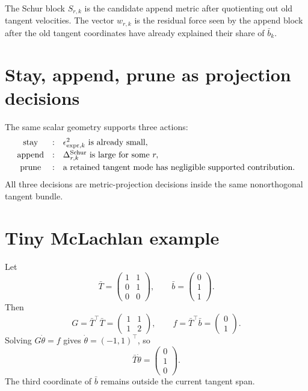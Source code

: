 \documentclass[10pt,twocolumn]{article}
\begin{document}
\begin{jargonbox}
The Schur block \(S_{r,k}\) is the candidate append metric after quotienting out old tangent velocities. The vector \(w_{r,k}\) is the residual force seen by the append block after the old tangent coordinates have already explained their share of \(\bar b_k\).
\end{jargonbox}

\section{Stay, append, prune as projection decisions}

The same scalar geometry supports three actions:
\begin{equation}
\begin{array}{ccl}
\text{stay}&:&\epsilon_{{\rm expr},k}^2\text{ is already small},\\[1mm]
\text{append}&:&\Delta_{r,k}^{\rm Schur}\text{ is large for some }r,\\[1mm]
\text{prune}&:&\text{a retained tangent mode has negligible supported contribution}.
\end{array}
\label{eq:p2_actions}
\end{equation}
All three decisions are metric-projection decisions inside the same nonorthogonal tangent bundle.

\appendix
\section{Tiny McLachlan example}

Let
\begin{equation}
\bar T=\begin{pmatrix}1&1\\0&1\\0&0\end{pmatrix},
\qquad
\bar b=\begin{pmatrix}0\\1\\1\end{pmatrix}.
\end{equation}
Then
\begin{equation}
G=\bar T^\top\bar T=\begin{pmatrix}1&1\\1&2\end{pmatrix},
\qquad
f=\bar T^\top\bar b=\begin{pmatrix}0\\1\end{pmatrix}.
\end{equation}
Solving \(G\dot\theta=f\) gives \(\dot\theta=(-1,1)^\top\), so
\begin{equation}
\bar T\dot\theta=\begin{pmatrix}0\\1\\0\end{pmatrix}.
\end{equation}
The third coordinate of \(\bar b\) remains outside the current tangent span.
\end{document}
